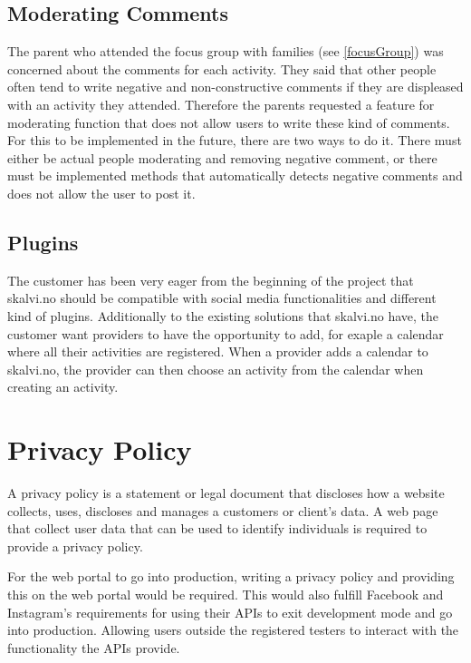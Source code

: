 \subsection{Moderating Comments}
The parent who attended the focus group with families (see \ref{focusGroup}) was concerned about the comments for each activity. They said that other people often tend to write negative and non-constructive comments if they are displeased with an activity they attended. Therefore the parents requested a feature for moderating function that does not allow users to write these kind of comments. For this to be implemented in the future, there are two ways to do it. There must either be actual people moderating and removing negative comment, or there must be implemented methods that automatically detects negative comments and does not allow the user to post it. 

\subsection{Plugins}
The customer has been very eager from the beginning of the project that skalvi.no should be compatible with social media functionalities and different kind of plugins. Additionally to the existing solutions that skalvi.no have, the customer want providers to have the opportunity to add, for exaple a calendar where all their activities are registered. When a provider adds a calendar to skalvi.no, the provider can then choose an activity from the calendar when creating an activity.

\section{Privacy Policy}
A privacy policy is a statement or legal document that discloses how a website collects, uses, discloses and manages a customers or client's data. A web page that collect user data that can be used to identify individuals is required to provide a privacy policy.

For the web portal to go into production, writing a privacy policy and providing this on the web portal would be required. This would also fulfill Facebook and Instagram's requirements for using their APIs to exit development mode and go into production. Allowing users outside the registered testers to interact with the functionality the APIs provide.

\cleardoublepage